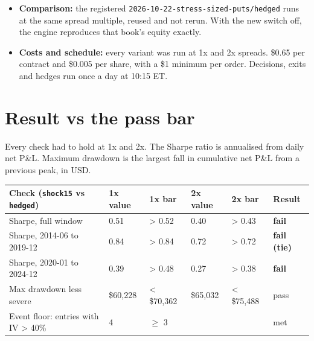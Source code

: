 \documentclass{article}
\begin{document}
\begin{itemize}
\begin{itemize}
\item \texttt{budget25}: budget 25\%, today's shock max(60\%, IV);

\item \texttt{budget15}: budget 15\%, today's shock.

\end{itemize}

\item \textbf{Comparison:} the registered \texttt{2026-\allowbreak{}10-\allowbreak{}22-\allowbreak{}stress-\allowbreak{}sized-\allowbreak{}puts/\allowbreak{}hedged} runs at the same spread multiple, reused and not rerun. With the new switch off, the engine reproduces that book's equity exactly.

\item \textbf{Costs and schedule:} every variant was run at 1x and 2x spreads. \$0.65 per contract and \$0.005 per share, with a \$1 minimum per order. Decisions, exits and hedges run once a day at 10:15 ET.

\end{itemize}

\section{Result vs the pass bar}

Every check had to hold at 1x and 2x. The Sharpe ratio is annualised from daily net P\&L. Maximum drawdown is the largest fall in cumulative net P\&L from a previous peak, in USD.

\begin{center}\small
\begin{tabularx}{\linewidth}{>{\raggedright\arraybackslash}X l l l l >{\raggedright\arraybackslash}X}
\toprule
\textbf{Check (\texttt{shock15} vs \texttt{hedged})} & \textbf{1x value} & \textbf{1x bar} & \textbf{2x value} & \textbf{2x bar} & \textbf{Result} \\
\midrule
Sharpe, full window & 0.51 & > 0.52 & 0.40 & > 0.43 & \textbf{fail} \\
Sharpe, 2014-06 to 2019-12 & 0.84 & > 0.84 & 0.72 & > 0.72 & \textbf{fail (tie)} \\
Sharpe, 2020-01 to 2024-12 & 0.39 & > 0.48 & 0.27 & > 0.38 & \textbf{fail} \\
Max drawdown less severe & \$60,228 & < \$70,362 & \$65,032 & < \$75,488 & pass \\
Event floor: entries with IV > 40\% & 4 & \ensuremath{\geq} 3 &  &  & met \\
\bottomrule
\end{tabularx}
\end{center}
\end{document}
